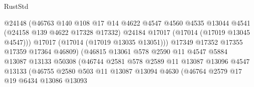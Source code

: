 \begin{lexlean}{RustStd}
\begin{coremodule}
{\begin{coremodule}
{{{{{{{{{{{{{{{{{{{{{{{{{{{{{{{{{{{{{{{{{{{{{{{{{{{{{{{                                      @24148
                                      (@46763
                                        @140
                                        @108
                                        @17
                                        @14
                                        @4622
                                        @4547
                                        @4560
                                        @4535
                                        @13044
                                        @4541
                                        (@24158 @139 @4622 @17328 @17332)
                                        @24184
                                        @17017
                                        (@17014 (@17019 @13045 @4547)))
                                      @17017
                                      (@17014 (@17019 @13035 @13051)))
                                    @17349
                                    @17352
                                    @17355
                                    @17359
                                    @17364
                                    @46809)
                                  (@46815
                                    @13061
                                    @578
                                    @2590
                                    @11
                                    @4547
                                    @5884
                                    @13087
                                    @13133
                                    @50308
                                    (@46744
                                      @2581
                                      @578
                                      @2589
                                      @11
                                      @13087
                                      @13096
                                      @4547
                                      @13133
                                      (@46755
                                        @2580
                                        @503
                                        @11
                                        @13087
                                        @13094
                                        @4630
                                        (@46764
                                          @2579
                                          @17
                                          @19
                                          @6434
                                          @13086
                                          @13093
}}}}}}}}}}}}}}}}}}}}}}}}}}}}}}}}}}}}}}}}}}}}}}}}}}}}}}}
\end{coremodule}}
\end{coremodule}
\end{lexlean}
